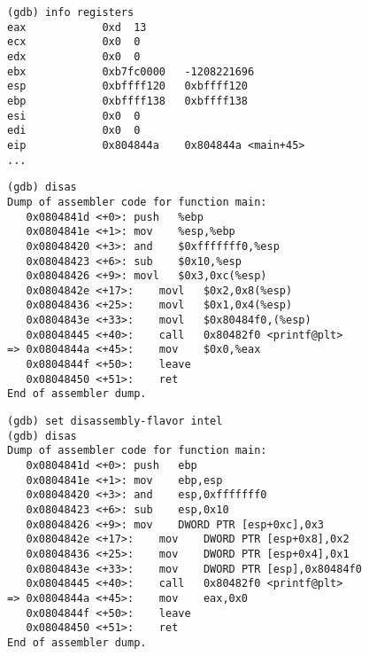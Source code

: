 


\begin{lstlisting}
(gdb) info registers
eax            0xd	13
ecx            0x0	0
edx            0x0	0
ebx            0xb7fc0000	-1208221696
esp            0xbffff120	0xbffff120
ebp            0xbffff138	0xbffff138
esi            0x0	0
edi            0x0	0
eip            0x804844a	0x804844a <main+45>
...
\end{lstlisting}


\begin{lstlisting}
(gdb) disas
Dump of assembler code for function main:
   0x0804841d <+0>:	push   %ebp
   0x0804841e <+1>:	mov    %esp,%ebp
   0x08048420 <+3>:	and    $0xfffffff0,%esp
   0x08048423 <+6>:	sub    $0x10,%esp
   0x08048426 <+9>:	movl   $0x3,0xc(%esp)
   0x0804842e <+17>:	movl   $0x2,0x8(%esp)
   0x08048436 <+25>:	movl   $0x1,0x4(%esp)
   0x0804843e <+33>:	movl   $0x80484f0,(%esp)
   0x08048445 <+40>:	call   0x80482f0 <printf@plt>
=> 0x0804844a <+45>:	mov    $0x0,%eax
   0x0804844f <+50>:	leave  
   0x08048450 <+51>:	ret    
End of assembler dump.
\end{lstlisting}


\begin{lstlisting}
(gdb) set disassembly-flavor intel
(gdb) disas
Dump of assembler code for function main:
   0x0804841d <+0>:	push   ebp
   0x0804841e <+1>:	mov    ebp,esp
   0x08048420 <+3>:	and    esp,0xfffffff0
   0x08048423 <+6>:	sub    esp,0x10
   0x08048426 <+9>:	mov    DWORD PTR [esp+0xc],0x3
   0x0804842e <+17>:	mov    DWORD PTR [esp+0x8],0x2
   0x08048436 <+25>:	mov    DWORD PTR [esp+0x4],0x1
   0x0804843e <+33>:	mov    DWORD PTR [esp],0x80484f0
   0x08048445 <+40>:	call   0x80482f0 <printf@plt>
=> 0x0804844a <+45>:	mov    eax,0x0
   0x0804844f <+50>:	leave  
   0x08048450 <+51>:	ret    
End of assembler dump.
\end{lstlisting}

